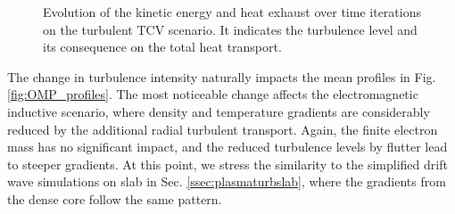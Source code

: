 \begin{figure}[H]
\begin{subfigure}[t]{0.45\textwidth}
		\label{fig:HeatExhaust}
	\end{subfigure}
	\caption{Evolution of the kinetic energy and heat exhaust over time iterations on the turbulent TCV scenario. It indicates the turbulence level and its consequence on the total heat transport.}
	\label{fig:performanceMetric}
\end{figure}

The change in turbulence intensity naturally impacts the mean profiles in Fig. \ref{fig:OMP_profiles}. The most noticeable change affects the electromagnetic inductive scenario, where density and temperature gradients are considerably reduced by the additional radial turbulent transport. Again, the finite electron mass has no significant impact, and the reduced turbulence levels by flutter lead to steeper gradients. At this point, we stress the similarity to the simplified drift wave simulations on slab in Sec. \ref{ssec:plasmaturbslab}, where the gradients from the dense core follow the same pattern. \newline

